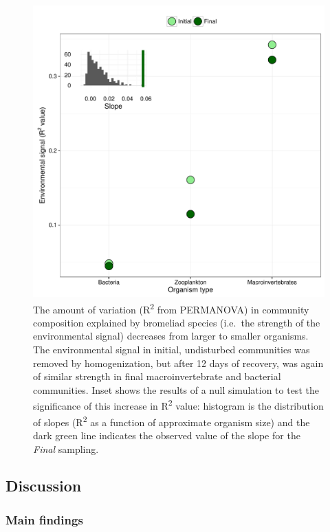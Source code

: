 \begin{figure}[htbp]
\centering
\includegraphics[width=5.5in]{figures/r2_plot.pdf}
\caption[Bromeliad species explains more variation in community composition in larger organisms.]{The amount of variation (R\textsuperscript{2} from PERMANOVA)
in community composition explained by bromeliad species (i.e.~the
strength of the environmental signal) decreases from larger to smaller
organisms. The environmental signal in initial, undisturbed communities
was removed by homogenization, but after 12 days of recovery, was again
of similar strength in final macroinvertebrate and bacterial
communities. Inset shows the results of a null simulation to test the
significance of this increase in R\textsuperscript{2} value: histogram
is the distribution of slopes (R\textsuperscript{2} as a function of
approximate organism size) and the dark green line indicates the
observed value of the slope for the \emph{Final} sampling.}
\label{fig:r2test}
\end{figure}

\subsection{Discussion}\label{discussion}

\subsubsection{Main findings}\label{main-findings}

